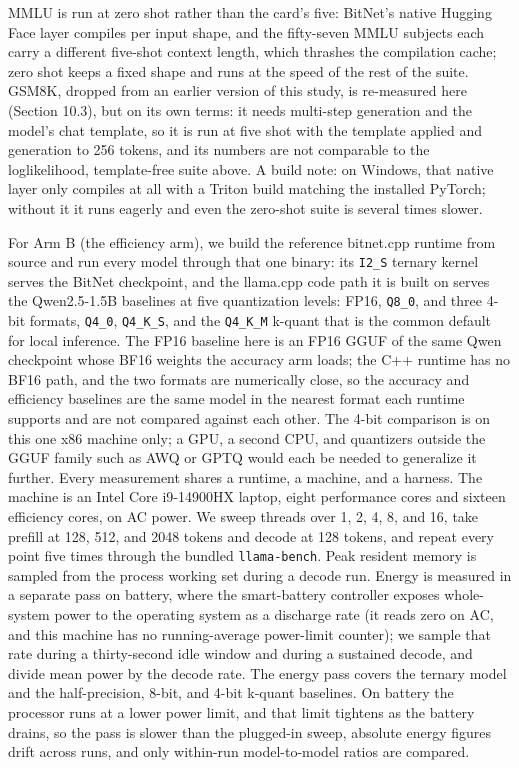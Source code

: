 \documentclass[11pt]{article}
\begin{document}
MMLU is run at zero shot rather than the card's five: BitNet's native Hugging Face layer
compiles per input shape, and the fifty-seven MMLU subjects each carry a different
five-shot context length, which thrashes the compilation cache; zero shot keeps a fixed
shape and runs at the speed of the rest of the suite. GSM8K, dropped from an earlier
version of this study, is re-measured here (Section 10.3), but on its own terms: it needs
multi-step generation and the model's chat template, so it is run at five shot with the
template applied and generation to 256 tokens, and its numbers are not comparable to the
loglikelihood, template-free suite above. A build note: on Windows, that native layer only compiles at
all with a Triton build matching the installed PyTorch; without it it runs eagerly and
even the zero-shot suite is several times slower.

For Arm B (the efficiency arm), we build the reference bitnet.cpp runtime from source and run
every model through that one binary: its \texttt{I2\_S} ternary kernel serves the BitNet
checkpoint, and the llama.cpp code path it is built on serves the Qwen2.5-1.5B
baselines at five quantization levels: FP16, \texttt{Q8\_0}, and three 4-bit formats, \texttt{Q4\_0},
\texttt{Q4\_K\_S}, and the \texttt{Q4\_K\_M} k-quant that is the common default for local inference. The FP16
baseline here is an FP16 GGUF of the same Qwen checkpoint whose BF16 weights the accuracy
arm loads; the C++ runtime has no BF16 path, and the two formats are numerically close,
so the accuracy and efficiency baselines are the same model in the nearest format each
runtime supports and are not compared against each other. The 4-bit comparison is on this
one x86 machine only; a GPU, a second CPU, and quantizers outside the GGUF family such as
AWQ or GPTQ would each be needed to generalize it further. Every measurement shares a
runtime, a machine, and a harness. The machine is an Intel Core i9-14900HX laptop, eight performance cores
and sixteen efficiency cores, on AC power. We sweep threads over 1, 2, 4, 8, and 16,
take prefill at 128, 512, and 2048 tokens and decode at 128 tokens, and repeat every
point five times through the bundled \texttt{llama-bench}. Peak resident memory is sampled from the process working set
during a decode run. Energy is measured in a separate pass on battery, where the
smart-battery controller exposes whole-system power to the operating system as a
discharge rate (it reads zero on AC, and this machine has no running-average
power-limit counter); we sample that rate during a thirty-second idle window and during
a sustained decode, and divide mean power by the decode rate. The energy pass covers the
ternary model and the half-precision, 8-bit, and 4-bit k-quant baselines. On battery the
processor runs at a lower power limit, and that limit tightens as the battery drains, so
the pass is slower than the plugged-in sweep, absolute energy figures drift across runs,
and only within-run model-to-model ratios are compared.
\end{document}
